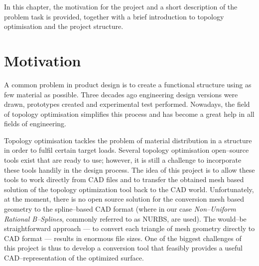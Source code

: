 In this chapter, the motivation for the project and a short description of the problem task is provided, together with a brief introduction to topology optimisation and the project structure.
\section{Motivation}
A common problem in product design is to create a functional structure using as few material as possible. Three decades ago engineering design versions were drawn, prototypes created and experimental test performed. Nowadays, the field of topology optimisation simplifies this process and has become a great help in all fields of engineering. 

Topology optimisation tackles the problem of material distribution in a structure in order to fulfil certain target loads. Several topology optimisation open--source tools exist that are ready to use; however, it is still a challenge to incorporate these tools handily in the design process. The idea of this project is to allow these tools to work directly from CAD files and to transfer the obtained mesh based solution of the topology optimization tool back to the CAD world. Unfortunately, at the moment, there is no open source solution for the conversion mesh based geometry to the spline--based CAD format (where in our case \emph{Non--Uniform Rational B--Splines}, commonly referred to as NURBS, are used). The would--be straightforward approach --- to convert each triangle of mesh geometry directly to CAD format --- results in enormous file sizes. One of the biggest challenges of this project is thus to develop a conversion tool that feasibly provides a useful CAD--representation of the optimized surface.


%
%

